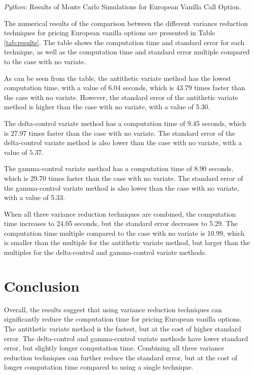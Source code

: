 \documentclass[11pt, a4paper, leqno]{article}
\begin{document}
\begin{center}
    \begin{table}[hbt!]
        
        \caption{\label{tab:results}\emph{Python:} Results of Monte Carlo Simulations for European Vanilla Call Option.}
    \end{table}
    \end{center}


The numerical results of the comparison between the different variance reduction techniques for pricing European vanilla options are presented in Table \ref{tab:results}. The table shows the computation time and standard error for each technique, as well as the computation time and standard error multiple compared to the case with no variate.

As can be seen from the table, the antithetic variate method has the lowest computation time, with a value of 6.04 seconds, which is 43.79 times faster than the case with no variate. However, the standard error of the antithetic variate method is higher than the case with no variate, with a value of 5.30.

The delta-control variate method has a computation time of 9.45 seconds, which is 27.97 times faster than the case with no variate. The standard error of the delta-control variate method is also lower than the case with no variate, with a value of 5.37.

The gamma-control variate method has a computation time of 8.90 seconds, which is 29.70 times faster than the case with no variate. The standard error of the gamma-control variate method is also lower than the case with no variate, with a value of 5.33.

When all three variance reduction techniques are combined, the computation time increases to 24.05 seconds, but the standard error decreases to 5.29. The computation time multiple compared to the case with no variate is 10.99, which is smaller than the multiple for the antithetic variate method, but larger than the multiples for the delta-control and gamma-control variate methods.

\section{Conclusion}\label{sec:conclusion}

Overall, the results suggest that using variance reduction techniques can significantly reduce the computation time for pricing European vanilla options. The antithetic variate method is the fastest, but at the cost of higher standard error. The delta-control and gamma-control variate methods have lower standard error, but slightly longer computation time. Combining all three variance reduction techniques can further reduce the standard error, but at the cost of longer computation time compared to using a single technique.






\printbibliography
{}



\end{document}
